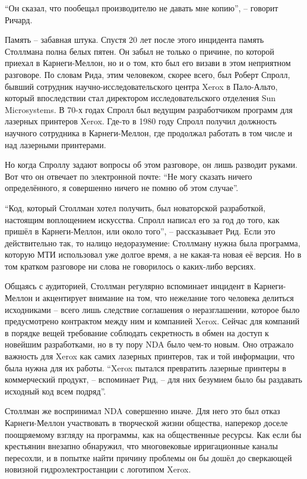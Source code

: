 \enquote{Он сказал, что пообещал производителю не давать мне копию}, -- говорит Ричард.

Память -- забавная штука. Спустя 20 лет после этого инцидента память Столлмана полна белых пятен. Он забыл не только о причине, по которой приехал в Карнеги-Меллон, но и о том, кто был его визави в этом неприятном разговоре. По словам Рида, этим человеком, скорее всего, был Роберт Спролл, бывший сотрудник научно-исследовательского центра Xerox в Пало-Альто, который впоследствии стал директором исследовательского отделения Sun Microsystems. В 70-х годах Спролл был ведущим разработчиком программ для лазерных принтеров Xerox. Где-то в 1980 году Спролл получил должность научного сотрудника в Карнеги-Меллон, где продолжал работать в том числе и над лазерными принтерами.

Но когда Спроллу задают вопросы об этом разговоре, он лишь разводит руками. Вот что он отвечает по электронной почте: \enquote{Не могу сказать ничего определённого, я совершенно ничего не помню об этом случае}.

\enquote{Код, который Столлман хотел получить, был новаторской разработкой, настоящим воплощением искусства. Спролл написал его за год до того, как пришёл в Карнеги-Меллон, или около того}, -- рассказывает Рид. Если это действительно так, то налицо недоразумение: Столлману нужна была программа, которую МТИ использовал уже долгое время, а не какая-та новая её версия. Но в том кратком разговоре ни слова не говорилось о каких-либо версиях.

Общаясь с аудиторией, Столлман регулярно вспоминает инцидент в Карнеги-Меллон и акцентирует внимание на том, что нежелание того человека делиться исходниками -- всего лишь следствие соглашения о неразглашении, которое было предусмотрено контрактом между ним и компанией Xerox. Сейчас для компаний в порядке вещей требование соблюдать секретность в обмен на доступ к новейшим разработками, но в ту пору NDA было чем-то новым. Оно отражало важность для Xerox как самих лазерных принтеров, так и той информации, что была нужна для их работы. \enquote{Xerox пытался превратить лазерные принтеры в коммерческий продукт, -- вспоминает Рид, -- для них безумием было бы раздавать исходный код всем подряд}.

Столлман же воспринимал NDA совершенно иначе. Для него это был отказ Карнеги-Меллон участвовать в творческой жизни общества, наперекор доселе поощряемому взгляду на программы, как на общественные ресурсы. Как если бы крестьянин внезапно обнаружил, что многовековые ирригационные каналы пересохли, и в попытке найти причину проблемы он бы дошёл до сверкающей новизной гидроэлектростанции с логотипом Xerox.

